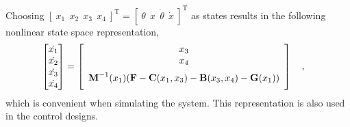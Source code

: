 Choosing $ [\ x_1\ \ x_2\ \ x_3\ \ x_4\ ]^\mathrm{T} = [\ \theta\ \ x\ \ \dot{\theta}\ \ \dot{x}\ ]^\mathrm{T} $ as states results in the following nonlinear state space representation,
%
\begin{align}
  \begin{bmatrix}
    \dot{x_1} \\
    \dot{x_2} \\
    \dot{x_3} \\
    \dot{x_4}
  \end{bmatrix}
&=
  \left[
    \begin{array}{c}
      x_3 \\
      x_4 \\
      \multirow{2}{*}{$ \vec{M}^{-1}(x_1) ( \vec{F} - \vec{C}(x_1,x_3) - \vec{B}(x_3,x_4) - \vec{G}(x_1) ) $}\\
      \phantom{eq}
    \end{array}
  \right]
  \label{eq:nonlinearStateSpace} \ \ \ ,
\end{align}
%
which is convenient when simulating the system. This representation is also used in the control designs.


